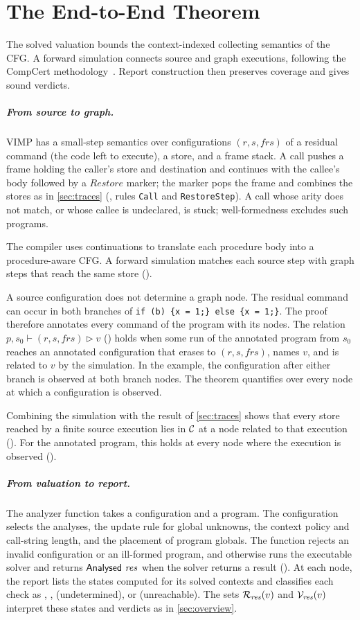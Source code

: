 \section{The End-to-End Theorem}
\label{sec:theorem}

The solved valuation bounds the context-indexed collecting semantics of the
CFG\@. A forward simulation connects source and graph executions, following
the CompCert methodology~\cite{leroy09}. Report construction then preserves
coverage and gives sound verdicts.

\subparagraph*{From source to graph.}
VIMP has a small-step semantics  over configurations
$(r, s, \mathit{frs})$ of a residual command (the code left to execute), a
store, and a frame stack. A
call pushes a frame holding the caller's store and destination and continues
with the callee's body followed by a $\mathit{Restore}$ marker; the marker pops
the frame and combines the stores as in \cref{sec:traces}
(, rules \texttt{Call} and \texttt{RestoreStep}). A call whose
arity does not match, or whose callee is undeclared, is stuck; well-formedness
excludes such programs.

The compiler uses continuations to translate each procedure body into a
procedure-aware CFG\@. A forward simulation matches each source step with graph
steps that reach the same store ().

A source configuration does not determine a graph node. The residual command can occur in both branches of
\texttt{if (b) \{x = 1;\} else \{x = 1;\}}. The proof therefore annotates every
command of the program with its nodes. The relation
$p, s_0 \vdash (r, s, \mathit{frs}) \rhd v$ () holds when some
run of the annotated program from $s_0$ reaches an annotated configuration
that erases to $(r, s, \mathit{frs})$, names $v$, and is related to $v$ by the
simulation. In the example, the configuration after either branch is
observed at both branch nodes. The theorem quantifies over every node at which
a configuration is observed.

Combining the simulation with the result of \cref{sec:traces} shows that every
store reached by a finite source execution lies in $\mathcal{C}$ at a node
related to that execution (). For the
annotated program, this holds at every node where the execution is observed
().

\subparagraph*{From valuation to report.}
The analyzer function  takes a configuration and a
program. The configuration selects the analyses, the update rule for global
unknowns, the context policy and call-string length, and the placement of
program globals. The function rejects an invalid
configuration or an ill-formed program, and otherwise runs the executable
solver and returns $\textsf{Analysed}~\mathit{res}$ when the solver returns a
result (). At each node, the report lists the states
computed for its solved contexts and classifies each check as
, ,  (undetermined), or
 (unreachable). The sets $\mathcal{R}_{\mathit{res}}(v)$ and
$\mathcal{V}_{\mathit{res}}(v)$ interpret these states and verdicts as in
\cref{sec:overview}.

